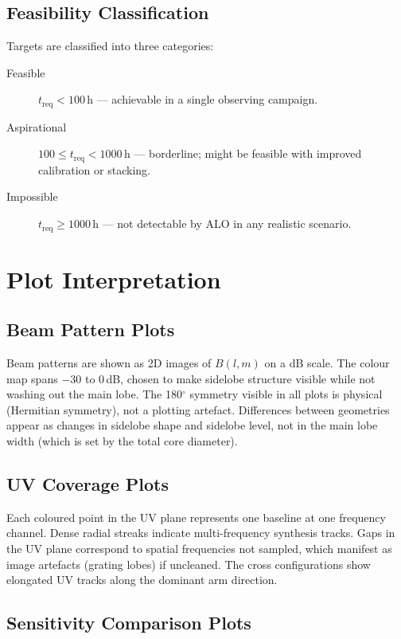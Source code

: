 \documentclass[12pt,a4paper]{article}
\begin{document}
\subsection{Feasibility Classification}

Targets are classified into three categories:
\begin{description}
  \item[Feasible] $t_\mathrm{req} < 100$\,h — achievable in a single observing
    campaign.
  \item[Aspirational] $100 \le t_\mathrm{req} < 1000$\,h — borderline; might
    be feasible with improved calibration or stacking.
  \item[Impossible] $t_\mathrm{req} \ge 1000$\,h — not detectable by ALO in
    any realistic scenario.
\end{description}

\section{Plot Interpretation}
\label{sec:plot_interp}

\subsection{Beam Pattern Plots}

Beam patterns are shown as 2D images of $B(l,m)$ on a dB scale.
The colour map spans $-30$ to $0$\,dB, chosen to make sidelobe structure
visible while not washing out the main lobe.
The 180$^\circ$ symmetry visible in all plots is physical (Hermitian symmetry),
not a plotting artefact.
Differences between geometries appear as changes in sidelobe shape and
sidelobe level, not in the main lobe width (which is set by the total core
diameter).

\subsection{UV Coverage Plots}

Each coloured point in the UV plane represents one baseline at one frequency
channel.
Dense radial streaks indicate multi-frequency synthesis tracks.
Gaps in the UV plane correspond to spatial frequencies not sampled, which
manifest as image artefacts (grating lobes) if uncleaned.
The cross configurations show elongated UV tracks along the dominant arm
direction.

\subsection{Sensitivity Comparison Plots}
\end{document}
